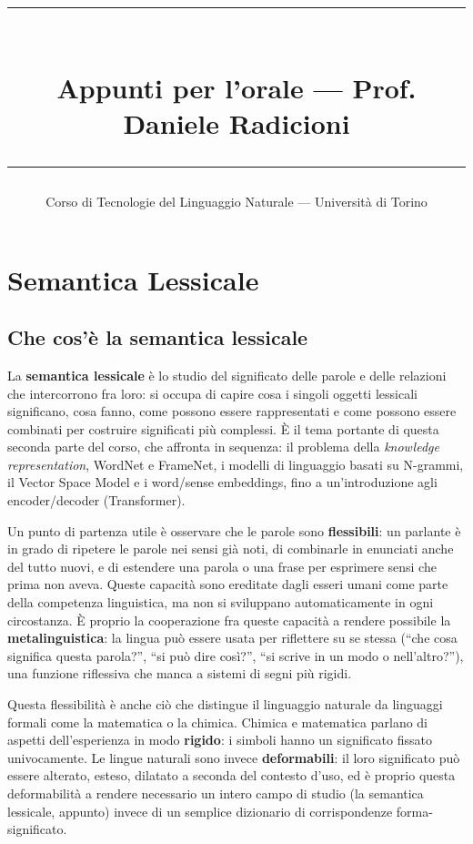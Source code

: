 \documentclass[11pt,a4paper]{report}
\title{\vspace{-1cm}{\large Tecnologie del Linguaggio Naturale --- Parte Teorica}\\[0.3cm]
  \rule{\linewidth}{1pt}\\[0.3cm]
  {\Large\bfseries Appunti per l'orale --- Prof. Daniele Radicioni}\\[0.3cm]
  \rule{\linewidth}{1pt}}
\author{Corso di Tecnologie del Linguaggio Naturale --- Università di Torino}
\date{}
\begin{document}
\maketitle
\tableofcontents
\newpage

\chapter{Semantica Lessicale}

\section{Che cos'è la semantica lessicale}

La \textbf{semantica lessicale} è lo studio del significato delle parole e delle relazioni che intercorrono fra loro: si occupa di capire cosa i singoli oggetti lessicali significano, cosa fanno, come possono essere rappresentati e come possono essere combinati per costruire significati più complessi. È il tema portante di questa seconda parte del corso, che affronta in sequenza: il problema della \emph{knowledge representation}, WordNet e FrameNet, i modelli di linguaggio basati su N-grammi, il Vector Space Model e i word/sense embeddings, fino a un'introduzione agli encoder/decoder (Transformer).

Un punto di partenza utile è osservare che le parole sono \textbf{flessibili}: un parlante è in grado di ripetere le parole nei sensi già noti, di combinarle in enunciati anche del tutto nuovi, e di estendere una parola o una frase per esprimere sensi che prima non aveva. Queste capacità sono ereditate dagli esseri umani come parte della competenza linguistica, ma non si sviluppano automaticamente in ogni circostanza. È proprio la cooperazione fra queste capacità a rendere possibile la \textbf{metalinguistica}: la lingua può essere usata per riflettere su se stessa (``che cosa significa questa parola?'', ``si può dire così?'', ``si scrive in un modo o nell'altro?''), una funzione riflessiva che manca a sistemi di segni più rigidi.

Questa flessibilità è anche ciò che distingue il linguaggio naturale da linguaggi formali come la matematica o la chimica. Chimica e matematica parlano di aspetti dell'esperienza in modo \textbf{rigido}: i simboli hanno un significato fissato univocamente. Le lingue naturali sono invece \textbf{deformabili}: il loro significato può essere alterato, esteso, dilatato a seconda del contesto d'uso, ed è proprio questa deformabilità a rendere necessario un intero campo di studio (la semantica lessicale, appunto) invece di un semplice dizionario di corrispondenze forma-significato.
\end{document}
